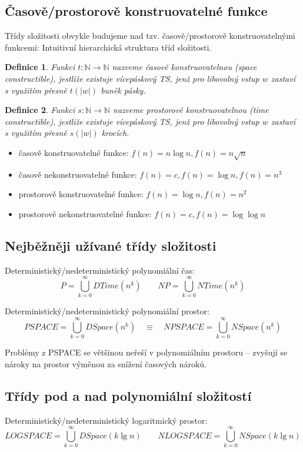 \documentclass[a4paper, 11pt]{report}
\newtheorem{mydef}{Definice}[chapter]
\begin{document}
\subsection{Časově/prostorově konstruovatelné funkce}

Třídy složitosti obvykle budujeme nad tzv. časově/prostorově konstruovatelnými funkcemi: Intuitivní hierarchická struktura tříd složitosti.

\begin{mydef}
Funkci $t: \mathbb{N} \to \mathbb{N}$ nazveme časově konstruovatelnou (space constructible), jestliže existuje vícepáskový TS, jenž pro libovolný vstup $w$ zastaví s využitím přesně $t(|w|)$ buněk pásky.
\end{mydef}

\begin{mydef}
Funkci $s: \mathbb{N} \to \mathbb{N}$ nazveme prostorově konstruovatelnou (time constructible), jestliže existuje vícepáskový TS, jenž pro libovolný vstup $w$ zastaví s využitím přesně $s(|w|)$ krocích.
\end{mydef}

\begin{itemize}
	\item časově konstruovatelné funkce: $f(n) = n \log{n}, f(n) = n \sqrt{n}$
	\item časově nekonstruovatelné funkce: $f(n) = c, f(n) = \log{n}, f(n) = n^3$
	\item prostorově konstruovatelné funkce: $f(n) = \log{n}, f(n) = n^2$
	\item prostorově nekonstruovatelné funkce: $f(n) = c, f(n) = \log{\log{n}}$
\end{itemize}

\subsection{Nejběžněji užívané třídy složitosti}

Deterministický/nedeterministický polynomiální čas:
$$P = \bigcup\limits_{k=0}^\infty DTime(n^k) \quad \quad
NP = \bigcup\limits_{k=0}^\infty NTime(n^k)$$

Deterministický/nedeterministický polynomiální prostor:
$$PSPACE = \bigcup\limits_{k=0}^\infty DSpace(n^k)
\quad \equiv \quad
NPSPACE = \bigcup\limits_{k=0}^\infty NSpace(n^k)$$

Problémy z PSPACE se většinou neřeší v polynomiálním prostoru -- zvyšují se nároky na prostor výměnou za snížení časových nároků.

\subsection{Třídy pod a nad polynomiální složitostí}
Deterministický/nedeterministický logaritmický prostor:
$$LOGSPACE = \bigcup\limits_{k=0}^\infty DSpace(k \lg{n})
\quad \quad
NLOGSPACE = \bigcup\limits_{k=0}^\infty NSpace(k \lg{n})$$
\end{document}
